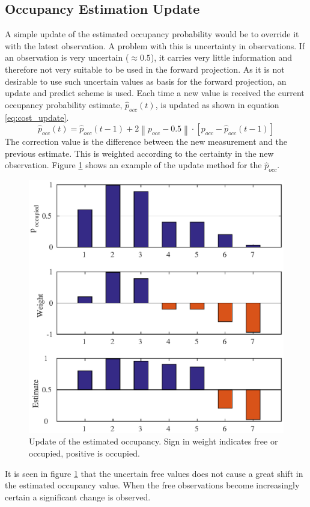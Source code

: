 \subsection{Occupancy Estimation Update}
A simple update of the estimated occupancy probability would be to override it with the latest observation.  
A problem with this is uncertainty in observations. 
If an observation is very uncertain ($\approx0.5$), it carries very little information and therefore not very suitable to be used in the forward projection. 
As it is not desirable to use such uncertain values as basis for the forward projection, an update and predict scheme is used.
Each time a new value is received the current occupancy probability estimate, \(\hat{p}_{occ}(t)\), is updated as shown in equation \ref{eq:cost_update}.
%
\begin{equation}
\label{eq:cost_update}
\hat{p}_{occ}(t) = \hat{p}_{occ}(t-1) +  2  \left\| p_{occ} - 0.5 \right\| \cdot \left[p_{occ} - \hat{p}_{occ}(t-1) \right]  
\end{equation}
%
The correction value is the difference between the new measurement and the previous estimate.
This is weighted according to the certainty in the new observation.  
Figure \ref{fig:cost_update} shows an example of the update method for the \(\hat{p}_{occ}\). 
\begin{figure}[htbp]
	\centering
	\includegraphics[width=1\linewidth]{chapters/cost_interpretation/figures/update}
	\caption{Update of the estimated occupancy. Sign in weight indicates free or occupied, positive is occupied. }
	\label{fig:cost_update}
\end{figure}
It is seen in figure \ref{fig:cost_update} that the uncertain free values does not cause a great shift in the estimated occupancy value. When the free observations become increasingly certain a significant change is observed. 

